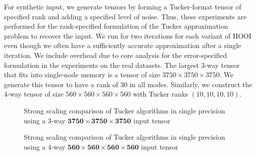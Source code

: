     For synthetic input, we generate tensors by forming a Tucker-format tensor of specified rank and adding a specified level of noise.
    Thus, these experiments are performed for the rank-specified formulation of the Tucker approximation problem to recover the input. 
    We run for two iterations for each variant of HOOI even though we often have a sufficiently accurate approximation after a single iteration.
    We include overhead due to core analysis for the error-specified formulation in the experiments on the real datasets.
    The largest 3-way tensor that fits into single-node memory is a
    tensor of size $3750 \times 3750 \times 3750$. 
    We generate this tensor to
    have a rank of $30$ in all modes.
    Similarly, we construct the 4-way tensor of size $560 \times 560 \times 560\times 
    560$ with Tucker ranks $(10,10,10,10)$.

    \begin{figure}
        \centering
        
        \caption[3-way Strong Scaling]{Strong scaling comparison of Tucker
        algorithms in single precision using a 3-way $\mathbf{3750 \times 3750
        \times 3750}$ input tensor }
        \label{fig:3way_scaling}
    \end{figure}

    \begin{figure}
        \centering
        
        \caption[4-way Strong Scaling]{Strong scaling comparison of Tucker algorithms in single
        precision using a 4-way $\mathbf{560 \times 560 \times 560 \times 560}$
        input tensor}
        \label{fig:4way_scaling}
    \end{figure}

